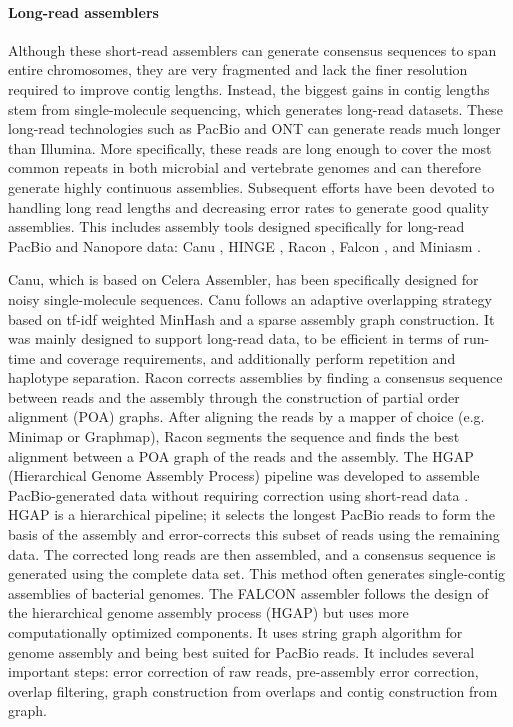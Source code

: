 \paragraph{Long-read assemblers}
Although these short-read assemblers can generate consensus sequences to span entire chromosomes, they are very fragmented and lack the finer resolution required to improve contig lengths. 
Instead, the biggest gains in contig lengths stem from single-molecule sequencing, which generates long-read datasets.
These long-read technologies such as PacBio and ONT can generate reads much longer than Illumina. 
More specifically, these reads are long enough to cover the most common repeats in both microbial and vertebrate genomes and can therefore generate highly continuous assemblies. 
Subsequent efforts have been devoted to handling long read lengths and decreasing error rates to generate good quality assemblies.
This includes assembly tools designed specifically for long-read PacBio and Nanopore data: Canu \citep{koren2017canu}, HINGE \citep{kamath2017hinge}, Racon \citep{vaser2017fast}, Falcon \citep{chin2016phased}, and Miniasm \citep{li2016minimap}.

Canu, which is based on Celera Assembler, has been specifically designed for noisy single-molecule sequences.
Canu follows an adaptive overlapping strategy based on tf-idf weighted MinHash \citep{berlin2015assembling} and a sparse assembly graph construction.
It was mainly designed to support long-read data, to be efficient in terms of run-time and coverage requirements, and additionally perform repetition and haplotype separation.
Racon corrects assemblies by finding a consensus sequence between reads and the assembly through the construction of partial order alignment (POA) graphs.
After aligning the reads by a mapper of choice (e.g. Minimap or Graphmap),
Racon segments the sequence and finds the best alignment between a POA graph of the reads and the assembly.
The HGAP (Hierarchical Genome Assembly Process) pipeline
was developed to assemble PacBio-generated data without requiring correction using short-read
data \citep{chin2013nonhybrid}. HGAP is a hierarchical pipeline; it selects the longest PacBio reads to form the basis
of the assembly and error-corrects this subset of reads using the remaining data. The corrected
long reads are then assembled, and a consensus sequence is generated using the complete data
set. This method often generates single-contig assemblies of bacterial genomes.
The FALCON assembler follows the design of the hierarchical genome assembly process (HGAP) but uses more computationally optimized components. It uses string graph algorithm for genome assembly and being best suited for PacBio reads.
It includes several important steps: error correction of raw reads, pre-assembly error correction, overlap filtering, graph construction from overlaps and contig construction from graph.

